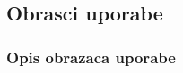 			\eject 
			


			\subsection{Obrasci uporabe}
				
				
				\subsubsection{Opis obrazaca uporabe}

